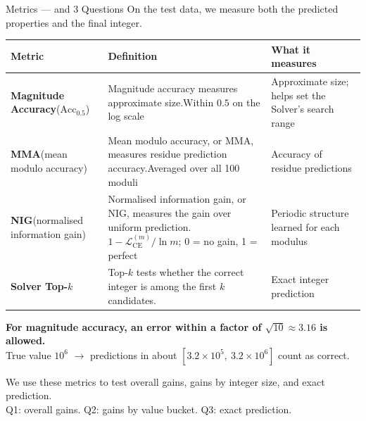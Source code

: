 \documentclass[aspectratio=169,10pt]{beamer}
\newcommand{\readout}[1]{\textcolor{readoutblue}{{\mdseries #1}}}
\begin{document}
\begin{frame}{Metrics --- and 3 Questions}
  \footnotesize
  \setlength{\parskip}{0pt}
  \readout{On the test data, we measure both the predicted properties and the final integer.}\\[0.3em]
  {\setlength{\tabcolsep}{3pt}\renewcommand{\arraystretch}{1.05}
  \begin{tabular}{@{}>{\raggedright\arraybackslash}p{}>{\raggedright\arraybackslash}p{}>{\raggedright\arraybackslash}p{}@{}}
    \toprule
    \textbf{Metric} & \textbf{Definition} & \textbf{What it measures} \\
    \midrule
    \textbf{Magnitude Accuracy}\newline ($\mathrm{Acc}_{0.5}$)
      & \readout{Magnitude accuracy measures approximate size.}\newline Within $0.5$ on the log scale
      & Approximate size; helps set the Solver's search range \\
    \addlinespace[0.2em]
    \textbf{MMA}\newline (mean modulo accuracy)
      & \readout{Mean modulo accuracy, or MMA, measures residue prediction accuracy.}\newline Averaged over all 100 moduli
      & Accuracy of residue predictions \\
    \addlinespace[0.2em]
    \textbf{NIG}\newline (normalised information gain)
      & \readout{Normalised information gain, or NIG, measures the gain over uniform prediction.}\newline
        $1-\mathcal{L}_{\mathrm{CE}}^{(m)}/\ln m$; 0 = no gain, 1 = perfect
      & Periodic structure learned for each modulus \\
    \addlinespace[0.2em]
    \textbf{Solver Top-$k$}
      & \readout{Top-$k$ tests whether the correct integer is among the first $k$ candidates.}
      & \alert{Exact integer prediction} \\
    \bottomrule
  \end{tabular}}
  \smallskip

  \textbf{For magnitude accuracy, an error within a factor of $\sqrt{10}\approx3.16$ is allowed.}\\
  True value $10^6$ $\to$ predictions in about
  $[3.2\times10^5,\ 3.2\times10^6]$ count as correct.
  \smallskip

  \readout{We use these metrics to test overall gains, gains by integer size, and exact prediction.}\\
  Q1: overall gains. \quad Q2: gains by value bucket. \quad Q3: exact prediction.
\end{frame}
\end{document}
